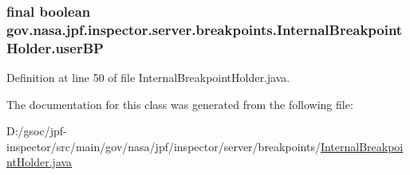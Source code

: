 \subsubsection[{\texorpdfstring{user\+BP}{userBP}}]{\setlength{\rightskip}{0pt plus 5cm}final boolean gov.\+nasa.\+jpf.\+inspector.\+server.\+breakpoints.\+Internal\+Breakpoint\+Holder.\+user\+BP\hspace{0.3cm}{\ttfamily [protected]}}\hypertarget{classgov_1_1nasa_1_1jpf_1_1inspector_1_1server_1_1breakpoints_1_1_internal_breakpoint_holder_a3e610f11675553b389c51a824b68a69d}{}\label{classgov_1_1nasa_1_1jpf_1_1inspector_1_1server_1_1breakpoints_1_1_internal_breakpoint_holder_a3e610f11675553b389c51a824b68a69d}


Definition at line 50 of file Internal\+Breakpoint\+Holder.\+java.



The documentation for this class was generated from the following file\+:\begin{DoxyCompactItemize}
\item 
D\+:/gsoc/jpf-\/inspector/src/main/gov/nasa/jpf/inspector/server/breakpoints/\hyperlink{_internal_breakpoint_holder_8java}{Internal\+Breakpoint\+Holder.\+java}\end{DoxyCompactItemize}
